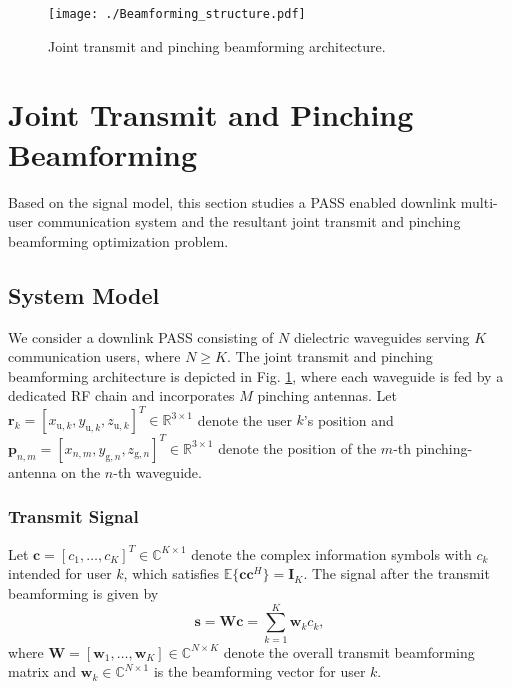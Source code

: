 
\begin{figure}[t!]
    \centering
    \texttt{[image: ./Beamforming\_structure.pdf]}
    \caption{Joint transmit and pinching beamforming architecture.}
    \label{beamforming_structure}
\end{figure}

\section{Joint Transmit and Pinching Beamforming} \label{sec:beamforing}

Based on the signal model, this section studies a PASS enabled downlink multi-user communication system and the resultant joint transmit and pinching beamforming optimization problem.

\subsection{System Model}

We consider a downlink PASS consisting of $N$ dielectric waveguides serving $K$ communication users, where $N \ge K$. The joint transmit and pinching beamforming architecture is depicted in Fig. \ref{beamforming_structure}, where each waveguide is fed by a dedicated RF chain and incorporates $M$ pinching antennas. Let $\mathbf{r}_k = [x_{\mathrm{u},k}, y_{\mathrm{u},k}, z_{\mathrm{u},k}]^T \in \mathbb{R}^{3 \times 1}$ denote the user $k$'s position and $\mathbf{p}_{n,m} = [x_{n,m}, y_{\mathrm{g},n}, z_{\mathrm{g},n}]^T \in \mathbb{R}^{3 \times 1}$ denote the position of the $m$-th pinching-antenna on the $n$-th waveguide.

\subsubsection{Transmit Signal} 
Let $\mathbf{c} = [c_1,\dots,c_K]^T \in \mathbb{C}^{K \times 1}$ denote the complex information symbols with $c_k$ intended for user $k$, which satisfies $\mathbb{E} \{\mathbf{c} \mathbf{c}^H\} = \mathbf{I}_K$. The signal after the transmit beamforming is given by
\begin{equation}
    \mathbf{s} = \mathbf{W}  \mathbf{c} = \sum_{k=1}^K \mathbf{w}_k c_k,
\end{equation}
where $\mathbf{W} = [\mathbf{w}_1,\dots,\mathbf{w}_K] \in \mathbb{C}^{N \times K}$ denote the overall transmit beamforming matrix and $\mathbf{w}_k \in \mathbb{C}^{N \times 1}$ is the beamforming vector for user $k$. 

